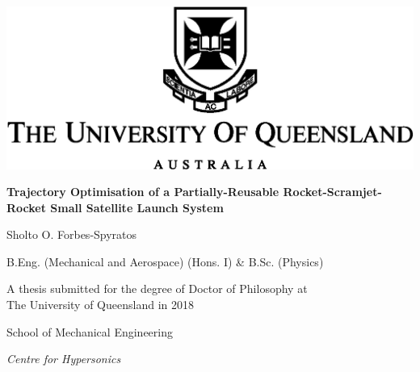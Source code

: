 




\thispagestyle{empty}
\begin{center}
	\centering
  \includegraphics{figures/uq_logo}

  \vspace{50pt}

  \textbf{\Large Trajectory Optimisation of a Partially-Reusable Rocket-Scramjet-Rocket Small Satellite Launch System}

  \vspace{25pt}

  {\large Sholto O. Forbes-Spyratos }
    
    \vspace{5pt}

  {\large B.Eng. (Mechanical and Aerospace) (Hons. I) \& B.Sc. (Physics)}


  \vspace{60pt}
                                                                                                                                                                                                                                                                                                                                                                                                                                                                                                                                                                                                                                                                                                                                                                                                                                                                                                                                                                                                                                                 
  \vfill

  {\large A thesis submitted for the degree of Doctor of Philosophy at\\ The University of Queensland in 2018}

  \vspace{20pt}

  School of Mechanical Engineering
  
  \textit{Centre for Hypersonics}

  \vfill
\end{center}

